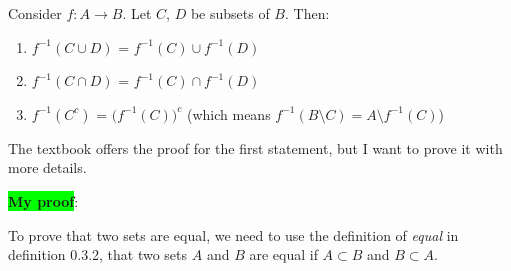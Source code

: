 \documentclass[12pt, letterpaper, oneside]{book}
\begin{document}
Consider $f: A \rightarrow B$. Let $C$, $D$ be subsets of $B$. Then:
\begin{enumerate}
  \item $f^{-1}(C \cup D)$ = $f^{-1}(C) \cup f^{-1}(D)$
  \item $f^{-1}(C \cap D)$ = $f^{-1}(C) \cap f^{-1}(D)$
  \item $f^{-1}(C^c)$ = $\bigl(f^{-1}(C)\bigr)^c$ (which means $f^{-1}(B
          \setminus C) = A \setminus f^{-1}(C)$)
\end{enumerate}

The textbook offers the proof for the first statement, but I want to prove it
with more details.

\colorbox{lime}{\textbf{My proof}}:

To prove that two sets are equal, we need to use the definition of \textit{
  equal} in definition 0.3.2, that two sets $A$ and $B$ are equal if $A \subset B$
and $B \subset A$.
\end{document}

